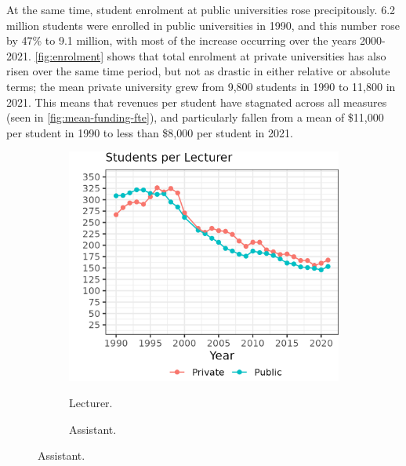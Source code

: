 At the same time, student enrolment at public universities rose precipitously.
6.2 million students were enrolled in public universities in 1990, and this number rose by 47\% to 9.1 million, with most of the increase occurring over the years 2000-2021.
\autoref{fig:enrolment} shows that total enrolment at private universities has also risen over the same time period, but not as drastic in either relative or absolute terms; the mean private university grew from 9,800 students in 1990 to 11,800 in 2021.
This means that revenues per student have stagnated across all measures (seen in \autoref{fig:mean-funding-fte}), and particularly fallen from a mean of \$11,000 per student in 1990 to less than \$8,000 per student in 2021.

\begin{figure}[h!]
    \centering
    \singlespacing
    \caption{Trends in Mean Student Enrolment per Professor, by University Sector and Faculty level.}
    \begin{subfigure}[b]{0.495\textwidth}
        \centering
        \caption{Lecturer.}
        \includegraphics[width=\textwidth]{figures/lecturer-fte-perprof.png}
        \label{fig:lecturer-fte-perprof}
    \end{subfigure}
    \begin{subfigure}[b]{0.495\textwidth}
        \centering
        \caption{Assistant.}

\end{subfigure}
\end{figure}
